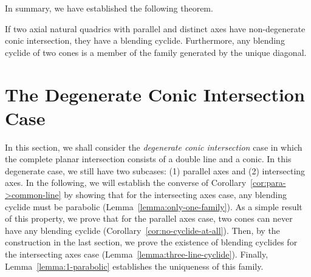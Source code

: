      In summary, we have established the following theorem.

\begin{theorem}
\label{thm:have-cyclide-parallel-axes}
     If two axial natural quadrics with parallel and distinct axes have 
non-degenerate conic intersection, they have a blending cyclide.  Furthermore,
any blending cyclide of two cones is a member of the
family generated by the unique diagonal.
\end{theorem}


\section{The Degenerate Conic Intersection Case}
\label{section:line-conic}

     In this section, we shall consider the {\em degenerate conic intersection}
 case in which the 
complete planar intersection consists of a double line and a conic. 
In this degenerate case, we still have two subcases: 
(1) parallel axes and (2) intersecting axes.  In the following, we will 
establish the converse of Corollary~\ref{cor:para->common-line} by showing 
that for the intersecting axes case, any blending cyclide must be 
parabolic (Lemma~\ref{lemma:only-one-family}).  As a simple result of this 
property, we prove that for the parallel axes case, two cones can never have 
any blending cyclide (Corollary~\ref{cor:no-cyclide-at-all}).  Then, by 
the construction in the last section, we prove the existence of blending 
cyclides for the intersecting axes case (Lemma~\ref{lemma:three-line-cyclide}).
Finally, Lemma~\ref{lemma:1-parabolic} establishes the uniqueness of this
family.

